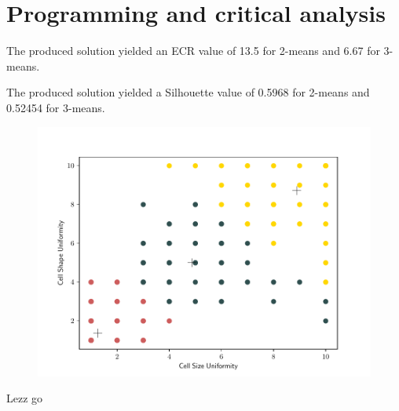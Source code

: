\documentclass{exam}
\begin{document}
    \section{Programming and critical analysis}
    \begin{questions}
        \setcounter{question}{3}
        \item \quad
        \begin{parts}
            \vspace{-1.6em}
            \item The produced solution yielded an ECR value of 13.5 for 2-means and 6.67 for 3-means.
            \item The produced solution yielded a Silhouette value of 0.5968 for 2-means and 0.52454 for 3-means. 
        \end{parts}
        \item \quad
        \begin{figure}[H]
            \centering
            \includegraphics[scale = 0.75]{3means.pdf}
        \end{figure}
        \item Lezz go 
    \end{questions}
   
    
    
\end{document}
